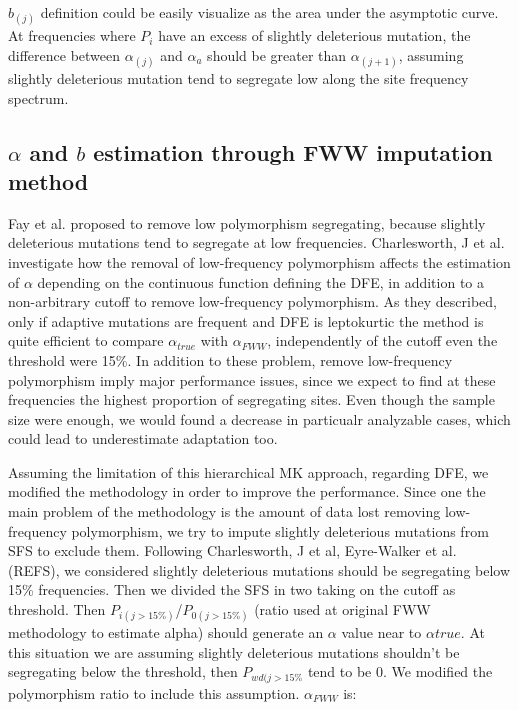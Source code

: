 \documentclass[11pt]{article}
\begin{document}
$b_{(j)}$ definition could be easily visualize as the area under the asymptotic curve. At frequencies where $P_{i}$ have an excess of slightly deleterious mutation, the difference between $\alpha_{(j)}$ and $\alpha_{a}$ should be greater than $\alpha_{(j+1)}$, assuming slightly deleterious mutation tend to segregate low along the site frequency spectrum.

\begin{figure}
	\centering	
	\scalebox{0.4}{}
\end{figure}


\subsection{$\alpha$ and $b$ estimation through FWW imputation method}
Fay et al. proposed to remove low polymorphism segregating, because slightly deleterious mutations tend to segregate at low frequencies. Charlesworth, J et al. investigate how the removal of low-frequency polymorphism affects the estimation of $\alpha$ depending on the continuous function defining the DFE, in addition to a non-arbitrary cutoff to remove low-frequency polymorphism. As they described, only if adaptive mutations are frequent and DFE is leptokurtic the method is quite efficient to compare $\alpha_{true}$ with $\alpha_{FWW}$, independently of the cutoff even the threshold were 15\%. In addition to these problem, remove low-frequency polymorphism imply major performance issues, since we expect to find at these frequencies the highest proportion of segregating sites. Even though the sample size were enough, we would found a decrease in particualr analyzable cases, which could lead to underestimate adaptation too.

Assuming the limitation of this hierarchical MK approach, regarding DFE, we modified the methodology in order to improve the performance. Since one the main problem of the methodology is the amount of data lost removing low-frequency polymorphism, we try to impute slightly deleterious mutations from SFS to exclude them. Following Charlesworth, J et al, Eyre-Walker et al. (REFS), we considered slightly deleterious mutations should be segregating below 15\% frequencies. Then we divided the SFS in two taking on the cutoff as threshold. Then $P_{i(j > 15\%)}$/$P_{0(j > 15\%)}$ (ratio used at original FWW methodology to estimate alpha) should generate an $\alpha$ value near to $\alpha{true}$. At this situation we are assuming slightly deleterious mutations shouldn't be segregating below the threshold, then $P_{wd(j>15\%}$ tend to be 0. We modified the polymorphism ratio to include this assumption. $\alpha_{FWW}$ is:
\end{document}
